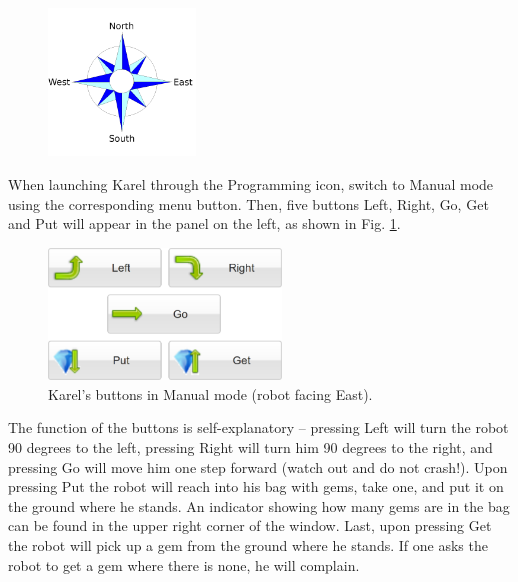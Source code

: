 \documentclass[article,A4,12pt]{llncs}
\begin{document}
\begin{figure}[!ht]
\begin{center}
\includegraphics[width=0.35\textwidth]{img/compass.png}
\vspace{-0mm}
\end{center}
\vspace{-1cm}
\end{figure}

\noindent
When launching Karel through the Programming icon, switch to Manual mode using the corresponding 
menu button. Then, five buttons Left, Right, Go, Get and Put will appear in the panel on the left,
as shown in Fig. \ref{fig:buttons}.

\begin{figure}[!ht]
\begin{center}
\includegraphics[width=6.2cm]{img/buttons-all.png}
\vspace{-0mm}
\caption{Karel's buttons in Manual mode (robot facing East).}
\label{fig:buttons}
\end{center}
\end{figure}
\noindent
The function of the buttons is self-explanatory -- pressing Left will turn the robot 90 degrees to the left,
pressing Right will turn him 90 degrees to the right, and pressing Go will move him one step forward 
(watch out and do not crash!). Upon pressing Put the robot will reach into his bag with gems, 
take one, and put it on the ground where he stands. 
An indicator showing how many gems are in the bag can be found in the upper right 
corner of the window. Last, upon pressing 
Get the robot will pick up a gem from the ground where he stands. If 
one asks the robot to get a gem where there is none, he will complain.
\end{document}
